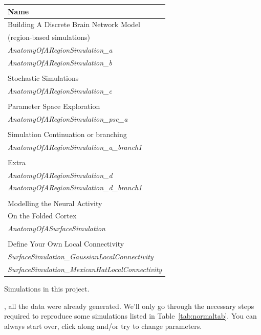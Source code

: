 \documentclass{tufte-handout}
\begin{document}
\begin{margintable}
  \centering
  \selectfont
  \begin{tabular}{l}
    \toprule
    Name \\
    \midrule
    \multicolumn{1}{l}{Building A Discrete Brain Network Model }\\
    \multicolumn{1}{l}{(region-based simulations)}\\
    \textit{AnatomyOfARegionSimulation\_a} \\
    \textit{AnatomyOfARegionSimulation\_b}  \\ 
    \\
    \multicolumn{1}{l}{Stochastic Simulations}\\
    \textit{AnatomyOfARegionSimulation\_c}  \\
    \\
    \multicolumn{1}{l}{Parameter Space Exploration}\\
    \textit{AnatomyOfARegionSimulation\_pse\_a} \\
    \\
    \multicolumn{1}{l}{Simulation Continuation or branching}\\
    \textit{AnatomyOfARegionSimulation\_a\_branch1} \\
    \\
    \multicolumn{1}{l}{Extra}\\
    \textit{AnatomyOfARegionSimulation\_d}  \\ 
    \textit{AnatomyOfARegionSimulation\_d\_branch1}  \\ 
    \\
    \multicolumn{1}{l}{Modelling the Neural Activity}\\
    \multicolumn{1}{l}{On the Folded Cortex}\\
    \textit{AnatomyOfASurfaceSimulation} \\
    \\
    \multicolumn{1}{l}{Define Your Own Local Connectivity}\\
     \textit{SurfaceSimulation\_GaussianLocalConnectivity} \\
     \textit{SurfaceSimulation\_MexicanHatLocalConnectivity}\\
    \bottomrule
  \end{tabular}
  \caption{Simulations in this project.}
  \label{tab:normaltab}
\end{margintable}


, all the data were already generated. We'll only go through the necessary steps required to reproduce some simulations listed in Table~\ref{tab:normaltab}. You can always start over, click along and/or try to change parameters.
\end{document}
